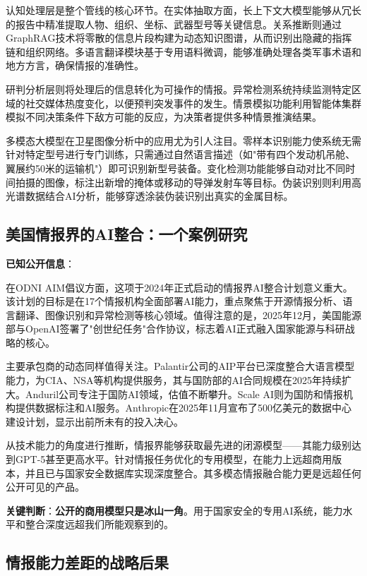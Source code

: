 认知处理层是整个管线的核心环节。在实体抽取方面，长上下文大模型能够从冗长的报告中精准提取人物、组织、坐标、武器型号等关键信息。关系推断则通过GraphRAG技术将零散的信息片段构建为动态知识图谱，从而识别出隐藏的指挥链和组织网络。多语言翻译模块基于专用语料微调，能够准确处理各类军事术语和地方方言，确保情报的准确性。

研判分析层则将处理后的信息转化为可操作的情报。异常检测系统持续监测特定区域的社交媒体热度变化，以便预判突发事件的发生。情景模拟功能利用智能体集群模拟不同决策条件下敌方可能的反应，为决策者提供多种情景推演结果。

多模态大模型在卫星图像分析中的应用尤为引人注目。零样本识别能力使系统无需针对特定型号进行专门训练，只需通过自然语言描述（如"带有四个发动机吊舱、翼展约50米的运输机"）即可识别新型号装备。变化检测功能能够自动对比不同时间拍摄的图像，标注出新增的掩体或移动的导弹发射车等目标。伪装识别则利用高光谱数据结合AI分析，能够穿透涂装伪装识别出真实的金属目标。

\subsection{美国情报界的AI整合：一个案例研究}

\textbf{已知公开信息}：

在ODNI AIM倡议方面，这项于2024年正式启动的情报界AI整合计划意义重大。该计划的目标是在17个情报机构全面部署AI能力，重点聚焦于开源情报分析、语言翻译、图像识别和异常检测等核心领域。值得注意的是，2025年12月，美国能源部与OpenAI签署了"创世纪任务"合作协议，标志着AI正式融入国家能源与科研战略的核心。

主要承包商的动态同样值得关注。Palantir公司的AIP平台已深度整合大语言模型能力，为CIA、NSA等机构提供服务，其与国防部的AI合同规模在2025年持续扩大。Anduril公司专注于国防AI领域，估值不断攀升。Scale AI则为国防和情报机构提供数据标注和AI服务。Anthropic在2025年11月宣布了500亿美元的数据中心建设计划，显示出前所未有的投入决心。

从技术能力的角度进行推断，情报界能够获取最先进的闭源模型——其能力级别达到GPT-5甚至更高水平。针对情报任务优化的专用模型，在能力上远超商用版本，并且已与国家安全数据库实现深度整合。其多模态情报融合能力更是远超任何公开可见的产品。

\textbf{关键判断}：\textbf{公开的商用模型只是冰山一角}。用于国家安全的专用AI系统，能力水平和整合深度远超我们所能观察到的。

\subsection{情报能力差距的战略后果}

